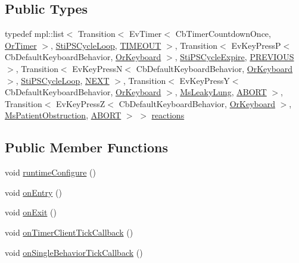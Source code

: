 \subsection*{Public Types}
\begin{DoxyCompactItemize}
\item 
typedef mpl\+::list$<$ Transition$<$ Ev\+Timer$<$ Cb\+Timer\+Countdown\+Once, \hyperlink{classsm__respira__1_1_1OrTimer}{Or\+Timer} $>$, \hyperlink{structsm__respira__1_1_1ps__cycle__inner__states_1_1StiPSCycleLoop}{Sti\+P\+S\+Cycle\+Loop}, \hyperlink{structsm__respira__1_1_1ps__cycle__inner__states_1_1StiPSCycleDwell_1_1TIMEOUT}{T\+I\+M\+E\+O\+UT} $>$, Transition$<$ Ev\+Key\+PressP$<$ Cb\+Default\+Keyboard\+Behavior, \hyperlink{classsm__respira__1_1_1OrKeyboard}{Or\+Keyboard} $>$, \hyperlink{structsm__respira__1_1_1ps__cycle__inner__states_1_1StiPSCycleExpire}{Sti\+P\+S\+Cycle\+Expire}, \hyperlink{structsm__respira__1_1_1ps__cycle__inner__states_1_1StiPSCycleDwell_1_1PREVIOUS}{P\+R\+E\+V\+I\+O\+US} $>$, Transition$<$ Ev\+Key\+PressN$<$ Cb\+Default\+Keyboard\+Behavior, \hyperlink{classsm__respira__1_1_1OrKeyboard}{Or\+Keyboard} $>$, \hyperlink{structsm__respira__1_1_1ps__cycle__inner__states_1_1StiPSCycleLoop}{Sti\+P\+S\+Cycle\+Loop}, \hyperlink{structsm__respira__1_1_1ps__cycle__inner__states_1_1StiPSCycleDwell_1_1NEXT}{N\+E\+XT} $>$, Transition$<$ Ev\+Key\+PressY$<$ Cb\+Default\+Keyboard\+Behavior, \hyperlink{classsm__respira__1_1_1OrKeyboard}{Or\+Keyboard} $>$, \hyperlink{classsm__respira__1_1_1MsLeakyLung}{Ms\+Leaky\+Lung}, \hyperlink{classABORT}{A\+B\+O\+RT} $>$, Transition$<$ Ev\+Key\+PressZ$<$ Cb\+Default\+Keyboard\+Behavior, \hyperlink{classsm__respira__1_1_1OrKeyboard}{Or\+Keyboard} $>$, \hyperlink{classsm__respira__1_1_1MsPatientObstruction}{Ms\+Patient\+Obstruction}, \hyperlink{classABORT}{A\+B\+O\+RT} $>$ $>$ \hyperlink{structsm__respira__1_1_1ps__cycle__inner__states_1_1StiPSCycleDwell_a71868ecd28a6aa6501a318a72207c2b5}{reactions}
\end{DoxyCompactItemize}
\subsection*{Public Member Functions}
\begin{DoxyCompactItemize}
\item 
void \hyperlink{structsm__respira__1_1_1ps__cycle__inner__states_1_1StiPSCycleDwell_ac3b64b8ba4020a441f1daa5b8b01fd91}{runtime\+Configure} ()
\item 
void \hyperlink{structsm__respira__1_1_1ps__cycle__inner__states_1_1StiPSCycleDwell_add9409472c890208afc0e0c358e0fa9c}{on\+Entry} ()
\item 
void \hyperlink{structsm__respira__1_1_1ps__cycle__inner__states_1_1StiPSCycleDwell_ab42b99cedc3a6f4af4583e9c8a07e25e}{on\+Exit} ()
\item 
void \hyperlink{structsm__respira__1_1_1ps__cycle__inner__states_1_1StiPSCycleDwell_a01112c5545a2fcf9bf83057eb2748f73}{on\+Timer\+Client\+Tick\+Callback} ()
\item 
void \hyperlink{structsm__respira__1_1_1ps__cycle__inner__states_1_1StiPSCycleDwell_a0e949b981066fe796ddb15fd7875056a}{on\+Single\+Behavior\+Tick\+Callback} ()
\end{DoxyCompactItemize}
